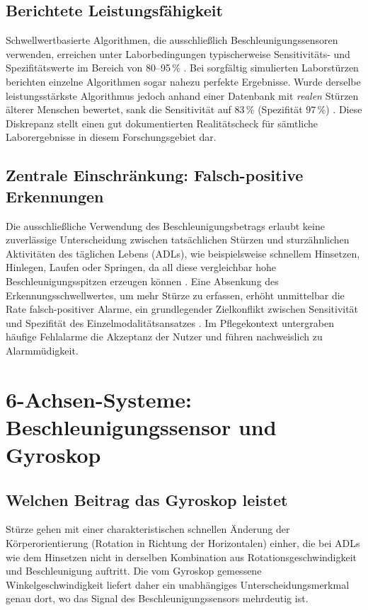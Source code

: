 \documentclass[11pt,a4paper,oneside]{report}
\begin{document}
\subsection{Berichtete Leistungsfähigkeit}
Schwellwertbasierte Algorithmen, die ausschließlich Beschleunigungssensoren
verwenden, erreichen unter Laborbedingungen typischerweise Sensitivitäts- und
Spezifitätswerte im Bereich von 80--95\,\%
\cite{dinh2021}. Bei sorgfältig simulierten Laborstürzen berichten einzelne
Algorithmen sogar nahezu perfekte Ergebnisse. Wurde derselbe
leistungsstärkste Algorithmus jedoch anhand einer Datenbank mit
\emph{realen} Stürzen älterer Menschen bewertet, sank die Sensitivität auf
$83\,\%$ (Spezifität $97\,\%$) \cite{bagala2012}. Diese Diskrepanz stellt
einen gut dokumentierten Realitätscheck für sämtliche Laborergebnisse in
diesem Forschungsgebiet dar.

\subsection{Zentrale Einschränkung: Falsch-positive Erkennungen}
Die ausschließliche Verwendung des Beschleunigungsbetrags erlaubt keine
zuverlässige Unterscheidung zwischen tatsächlichen Stürzen und sturzähnlichen
Aktivitäten des täglichen Lebens (\acp{ADL}), wie beispielsweise schnellem
Hinsetzen, Hinlegen, Laufen oder Springen, da all diese vergleichbar hohe
Beschleunigungsspitzen erzeugen können \cite{huynh2015}. Eine Absenkung des
Erkennungsschwellwertes, um mehr Stürze zu erfassen, erhöht unmittelbar die
Rate falsch-positiver Alarme, ein grundlegender Zielkonflikt zwischen
Sensitivität und Spezifität des Einzelmodalitätsansatzes
\cite{dinh2021}. Im Pflegekontext untergraben häufige Fehlalarme die
Akzeptanz der Nutzer und führen nachweislich zu Alarmmüdigkeit.

\section{6-Achsen-Systeme: Beschleunigungssensor und Gyroskop}
\label{sec:6axis}

\subsection{Welchen Beitrag das Gyroskop leistet}
Stürze gehen mit einer charakteristischen schnellen Änderung der
Körperorientierung (Rotation in Richtung der Horizontalen) einher, die bei
\acp{ADL} wie dem Hinsetzen nicht in derselben Kombination aus
Rotationsgeschwindigkeit und Beschleunigung auftritt. Die vom Gyroskop
gemessene Winkelgeschwindigkeit liefert daher ein unabhängiges
Unterscheidungsmerkmal genau dort, wo das Signal des Beschleunigungssensors
mehrdeutig ist.
\end{document}
